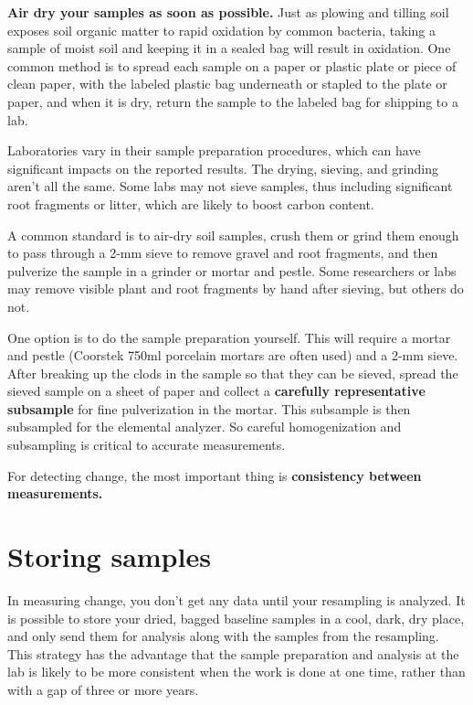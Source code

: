 \documentclass[11pt,letterpaper,oneside,onecolumn]{memoir}
\begin{document}
\textbf{Air dry your samples as soon as possible.} Just as plowing and tilling soil exposes soil organic matter to rapid oxidation by common bacteria, taking a sample of moist soil and keeping it in a sealed bag will result in oxidation. One common method is to spread each sample on a paper or plastic plate or piece of clean paper, with the labeled plastic bag underneath or stapled to the plate or paper, and when it is dry, return the sample to the labeled bag for shipping to a lab.

Laboratories vary in their sample preparation procedures, which can have significant impacts on the reported results. The drying, sieving, and grinding aren't all the same. Some labs may not sieve samples, thus including significant root fragments or litter, which are likely to boost carbon content.

A common standard is to air-dry soil samples, crush them or grind them enough to pass through a 2-mm sieve to remove gravel and root fragments, and then pulverize the sample in a grinder or mortar and pestle. Some researchers or labs may remove visible plant and root fragments by hand after sieving, but others do not.

One option is to do the sample preparation yourself. This will require a mortar and pestle (Coorstek 750ml porcelain mortars are often used) and a 2-mm sieve. After breaking up the clods in the sample so that they can be sieved, spread the sieved sample on a sheet of paper and collect a \textbf{carefully representative subsample} for fine pulverization in the mortar. This subsample is then subsampled for the elemental analyzer. So careful homogenization and subsampling is critical to accurate measurements.

For detecting change, the most important thing is \textbf{consistency between measurements.}

\section{Storing samples}

In measuring change, you don't get any data until your resampling is analyzed. It is possible to store your dried, bagged baseline samples in a cool, dark, dry place, and only send them for analysis along with the samples from the resampling. This strategy has the advantage that the sample preparation and analysis at the lab is likely to be more consistent when the work is done at one time, rather than with a gap of three or more years.
\end{document}

